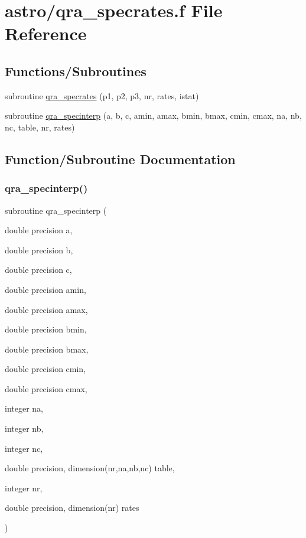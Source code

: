 \hypertarget{qra__specrates_8f}{}\section{astro/qra\+\_\+specrates.f File Reference}
\label{qra__specrates_8f}
\subsection*{Functions/\+Subroutines}
\begin{DoxyCompactItemize}
\item 
subroutine \hyperlink{qra__specrates_8f_abd5f419ff83b083d70cff47cd2fc3190}{qra\+\_\+specrates} (p1, p2, p3, nr, rates, istat)
\item 
subroutine \hyperlink{qra__specrates_8f_ac71204009db46c8ce5721111869127e7}{qra\+\_\+specinterp} (a, b, c, amin, amax, bmin, bmax, cmin, cmax, na, nb, nc, table, nr, rates)
\end{DoxyCompactItemize}


\subsection{Function/\+Subroutine Documentation}
\mbox{\label{qra__specrates_8f_ac71204009db46c8ce5721111869127e7}} 
\subsubsection{\texorpdfstring{qra\+\_\+specinterp()}{qra\_specinterp()}}
{\footnotesize\ttfamily subroutine qra\+\_\+specinterp (\begin{DoxyParamCaption}\item[{double precision}]{a,  }\item[{double precision}]{b,  }\item[{double precision}]{c,  }\item[{double precision}]{amin,  }\item[{double precision}]{amax,  }\item[{double precision}]{bmin,  }\item[{double precision}]{bmax,  }\item[{double precision}]{cmin,  }\item[{double precision}]{cmax,  }\item[{integer}]{na,  }\item[{integer}]{nb,  }\item[{integer}]{nc,  }\item[{double precision, dimension(nr,na,nb,nc)}]{table,  }\item[{integer}]{nr,  }\item[{double precision, dimension(nr)}]{rates }\end{DoxyParamCaption})}

